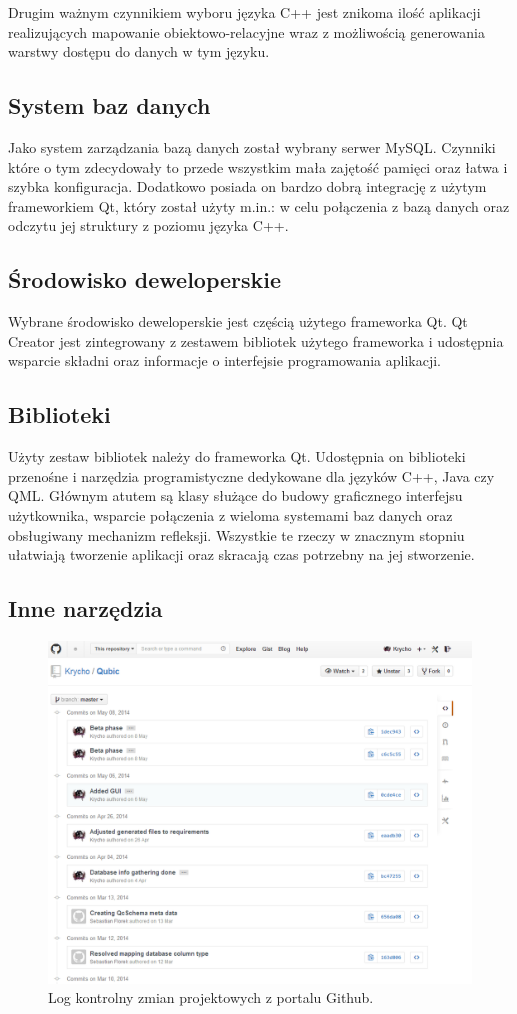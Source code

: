 \documentclass[12pt]{report}
\begin{document}
Drugim ważnym czynnikiem wyboru języka C++ jest znikoma ilość aplikacji realizujących mapowanie obiektowo-relacyjne wraz z możliwością generowania warstwy dostępu do danych w tym języku.

\subsection{System baz danych}
Jako system zarządzania bazą danych został wybrany serwer MySQL. Czynniki które o tym zdecydowały to przede wszystkim mała zajętość pamięci oraz łatwa i szybka konfiguracja. Dodatkowo posiada on bardzo dobrą integrację z użytym frameworkiem Qt, który został użyty m.in.: w celu połączenia z bazą danych oraz odczytu jej struktury z poziomu języka C++.
\subsection{Środowisko deweloperskie}
Wybrane środowisko deweloperskie jest częścią użytego frameworka Qt. Qt Creator jest zintegrowany z zestawem bibliotek użytego frameworka i udostępnia wsparcie składni oraz informacje o interfejsie programowania aplikacji.
\subsection{Biblioteki}
Użyty zestaw bibliotek należy do frameworka Qt. Udostępnia on biblioteki przenośne i narzędzia programistyczne dedykowane dla języków C++, Java czy QML. Głównym atutem są klasy służące do budowy graficznego interfejsu użytkownika, wsparcie połączenia z wieloma systemami baz danych oraz obsługiwany mechanizm refleksji. Wszystkie te rzeczy w znacznym stopniu ułatwiają tworzenie aplikacji oraz skracają czas potrzebny na jej stworzenie.
\subsection{Inne narzędzia}

\begin{figure}[h]
	\centering
	\includegraphics[width=.9\textwidth]{images/git.png}
	\caption{Log kontrolny zmian projektowych z portalu Github.}
\end{figure}
\FloatBarrier
\end{document}

